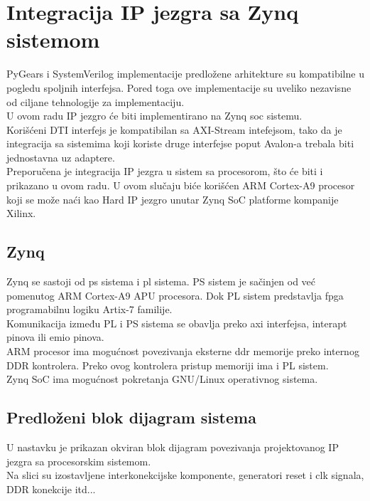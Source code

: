 \section{Integracija IP jezgra sa Zynq sistemom}

PyGears i SystemVerilog implementacije predložene arhitekture su kompatibilne u
pogledu spoljnih interfejsa.
Pored toga ove implementacije su uveliko nezavisne od ciljane tehnologije za
implementaciju. \\
U ovom radu IP jezgro će biti implementirano na Zynq \gls{soc} sistemu. \\

Korišćeni DTI interfejs je kompatibilan sa AXI-Stream intefejsom, tako da je
integracija sa sistemima koji koriste druge interfejse poput Avalon-a trebala
biti jednostavna uz adaptere. \\

Preporučena je integracija IP jezgra u sistem sa procesorom, što će biti i
prikazano u ovom radu.
U ovom slučaju biće korišćen ARM Cortex-A9 procesor koji se može naći kao Hard
IP jezgro unutar Zynq SoC platforme kompanije Xilinx. \\

\subsection{Zynq}

Zynq se sastoji od \gls{ps} sistema i \gls{pl} sistema.
PS sistem je sačinjen od već pomenutog ARM Cortex-A9 \gls{APU} procesora.
Dok PL sistem predstavlja \gls{fpga} programabilnu logiku Artix-7 familije. \\

Komunikacija između PL i PS sistema se obavlja preko \gls{axi} interfejsa,
interapt pinova ili \gls{emio} pinova.\\

ARM procesor ima mogućnost povezivanja eksterne \gls{ddr} memorije preko
internog DDR kontrolera.
Preko ovog kontrolera pristup memoriji ima i PL sistem. \\
Zynq SoC ima mogućnost pokretanja GNU/Linux operativnog sistema.

\newpage

\subsection{Predloženi blok dijagram sistema}

U nastavku je prikazan okviran blok dijagram povezivanja projektovanog IP jezgra
sa procesorskim sistemom. \\
Na slici su izostavljene interkonekcijske komponente, generatori reset i clk signala,
DDR konekcije itd... \\


